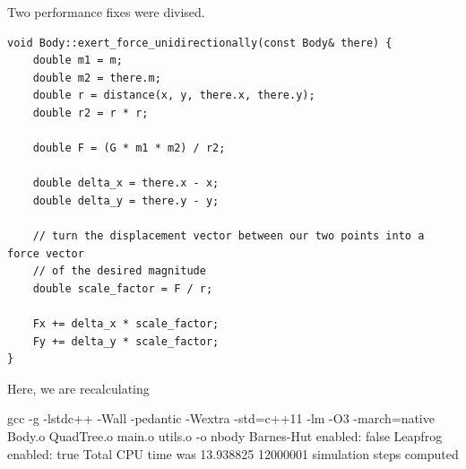 \documentclass[11pt,a4paper]{article}
\begin{document}

Two performance fixes were divised.

\begin{lstlisting}
void Body::exert_force_unidirectionally(const Body& there) {
    double m1 = m;
    double m2 = there.m;
    double r = distance(x, y, there.x, there.y);
    double r2 = r * r;

    double F = (G * m1 * m2) / r2;

    double delta_x = there.x - x;
    double delta_y = there.y - y;

    // turn the displacement vector between our two points into a force vector
    // of the desired magnitude
    double scale_factor = F / r;

    Fx += delta_x * scale_factor;
    Fy += delta_y * scale_factor;
}
\end{lstlisting}

Here, we are recalculating 


gcc -g -lstdc++ -Wall -pedantic -Wextra -std=c++11 -lm -O3 -march=native Body.o
QuadTree.o main.o utils.o -o nbody
Barnes-Hut enabled: false
Leapfrog enabled: true
Total CPU time was 13.938825
12000001 simulation steps computed
\end{document}
